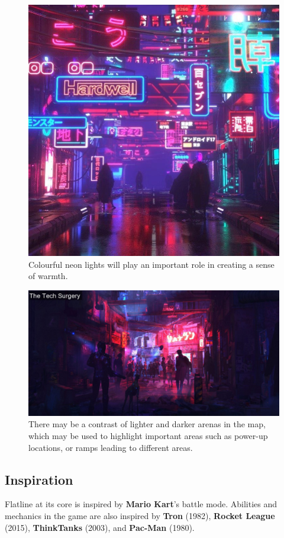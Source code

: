 \documentclass{article}
\newcommand{\name}{Flatline}
\theoremstyle{definition}
\begin{document}
\begin{figure}[htpb]
  \centering
  \includegraphics[width=0.8\linewidth]{theme02.jpg}
  \caption{Colourful neon lights will play an important role in creating
  a sense of warmth.}
\label{fig:theme02}
\end{figure}

\begin{figure}[htpb]
  \centering
  \includegraphics[width=0.8\linewidth]{theme03.jpg}
  \caption{There may be a contrast of lighter and darker arenas in the map,
  which may be used to highlight important areas such as power-up locations, or
ramps leading to different areas.}
\label{fig:theme03}
\end{figure}

\subsection{Inspiration}

\name{} at its core is inspired by \textbf{Mario Kart}'s battle mode. Abilities
and mechanics in the game are also inspired by \textbf{Tron} (1982),
\textbf{Rocket League} (2015), \textbf{ThinkTanks} (2003), and \textbf{Pac-Man}
(1980).
\end{document}
